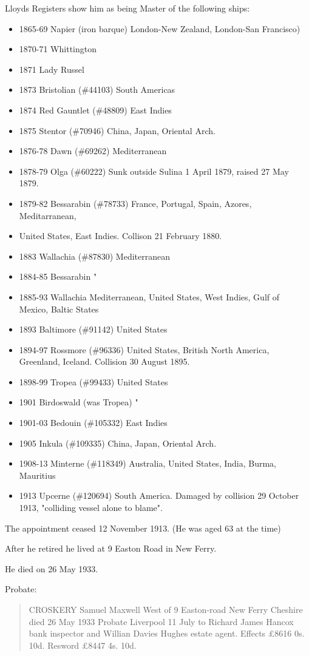Lloyds Registers show him as being Master of the following ships:\cite{LloydsRegCroskery}
\begin{itemize}[nosep]
\item 1865-69 Napier (iron barque) London-New Zealand, London-San Francisco)
\item 1870-71 Whittington
\item 1871 Lady Russel
\item 1873 Bristolian (\#44103) South Americas
\item 1874 Red Gauntlet (\#48809) East Indies
\item 1875 Stentor (\#70946) China, Japan, Oriental Arch.
\item 1876-78 Dawn (\#69262) Mediterranean
\item 1878-79 Olga (\#60222) Sunk outside Sulina 1 April 1879, raised 27 May 1879.
\item 1879-82 Bessarabin (\#78733) France, Portugal, Spain, Azores, Meditarranean,
\item United States, East Indies. Collison 21 February 1880.
\item 1883 Wallachia (\#87830) Mediterranean
\item 1884-85 Bessarabin "
\item 1885-93 Wallachia Mediterranean, United States, West Indies, Gulf of Mexico, Baltic States
\item 1893 Baltimore (\#91142) United States
\item 1894-97 Rossmore (\#96336) United States, British North America, Greenland, Iceland. Collision 30 August 1895.
\item 1898-99 Tropea (\#99433) United States
\item 1901 Birdoswald (was Tropea) "
\item 1901-03 Bedouin (\#105332) East Indies
\item 1905 Inkula (\#109335) China, Japan, Oriental Arch.
\item 1908-13 Minterne (\#118349) Australia, United States, India, Burma, Mauritius
\item 1913 Upcerne (\#120694) South America. Damaged by collision 29 October 1913, "colliding vessel alone to blame".
\end{itemize}

The appointment ceased 12 November 1913. (He was aged 63 at the time)

After he retired he lived at 9 Easton Road in New Ferry.

He died on 26 May 1933.\cite{WestCroskeryProbate}

Probate:\cite{WestCroskeryProbate}
\begin{quotation}
CROSKERY Samuel Maxwell West of 9 Easton-road New Ferry Cheshire died 26 May 1933 Probate Liverpool 11 July to Richard James Hancox bank inspector and Willian Davies Hughes estate agent.  Effects \pounds 8616 0s. 10d. Resword \pounds 8447 4s. 10d.
\end{quotation}
